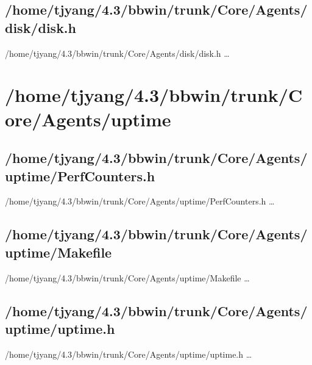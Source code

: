 \subsection{/home/tjyang/4.3/bbwin/trunk/Core/Agents/disk/disk.h}
\lstset{numberstyle=\tiny,numbers=left,
   breaklines=true,
   stepnumber=1,numbersep=5pt,firstnumber=1,
   xleftmargin=12pt,showstringspaces=false}
\noindent /home/tjyang/4.3/bbwin/trunk/Core/Agents/disk/disk.h  \ldots



\section{/home/tjyang/4.3/bbwin/trunk/Core/Agents/uptime}
\subsection{/home/tjyang/4.3/bbwin/trunk/Core/Agents/uptime/PerfCounters.h}
\lstset{numberstyle=\tiny,numbers=left,
   breaklines=true,
   stepnumber=1,numbersep=5pt,firstnumber=1,
   xleftmargin=12pt,showstringspaces=false}
\noindent /home/tjyang/4.3/bbwin/trunk/Core/Agents/uptime/PerfCounters.h  \ldots





\subsection{/home/tjyang/4.3/bbwin/trunk/Core/Agents/uptime/Makefile}
\lstset{numberstyle=\tiny,numbers=left,
   breaklines=true,
   stepnumber=1,numbersep=5pt,firstnumber=1,
   xleftmargin=12pt,showstringspaces=false}
\noindent /home/tjyang/4.3/bbwin/trunk/Core/Agents/uptime/Makefile  \ldots



\subsection{/home/tjyang/4.3/bbwin/trunk/Core/Agents/uptime/uptime.h}
\lstset{numberstyle=\tiny,numbers=left,
   breaklines=true,
   stepnumber=1,numbersep=5pt,firstnumber=1,
   xleftmargin=12pt,showstringspaces=false}
\noindent /home/tjyang/4.3/bbwin/trunk/Core/Agents/uptime/uptime.h  \ldots



